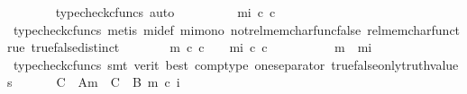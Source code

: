 \begin{isabellebody}
\ \ \ \ \ \ \isamarkupfalse%
\ {\isacharparenleft}{\kern0pt}typecheck{\isacharunderscore}{\kern0pt}cfuncs{\isacharcomma}{\kern0pt}\ auto{\isacharparenright}{\kern0pt}\isanewline
\ \ \ \ \isamarkupfalse%
\ \isamarkupfalse%
\ {\isachardoublequoteopen}{\isachardot}{\kern0pt}{\isachardot}{\kern0pt}{\isachardot}{\kern0pt}\ {\isacharequal}{\kern0pt}\ {\isacharparenleft}{\kern0pt}{\isasymchi}mi\ {\isasymcirc}\isactrlsub c\ c\ {\isacharequal}{\kern0pt}\ {\isasymt}{\isacharparenright}{\kern0pt}{\isachardoublequoteclose}\isanewline
\ \ \ \ \ \ \isamarkupfalse%
\ {\isacharparenleft}{\kern0pt}typecheck{\isacharunderscore}{\kern0pt}cfuncs{\isacharcomma}{\kern0pt}\ metis\ {\isasymchi}mi{\isacharunderscore}{\kern0pt}def\ mi{\isacharunderscore}{\kern0pt}mono\ not{\isacharunderscore}{\kern0pt}rel{\isacharunderscore}{\kern0pt}mem{\isacharunderscore}{\kern0pt}char{\isacharunderscore}{\kern0pt}func{\isacharunderscore}{\kern0pt}false\ rel{\isacharunderscore}{\kern0pt}mem{\isacharunderscore}{\kern0pt}char{\isacharunderscore}{\kern0pt}func{\isacharunderscore}{\kern0pt}true\ true{\isacharunderscore}{\kern0pt}false{\isacharunderscore}{\kern0pt}distinct{\isacharparenright}{\kern0pt}\isanewline
\ \ \ \ \isamarkupfalse%
\ \isamarkupfalse%
\ {\isachardoublequoteopen}{\isacharparenleft}{\kern0pt}{\isasymchi}m\ {\isasymcirc}\isactrlsub c\ c\ {\isacharequal}{\kern0pt}\ {\isasymt}{\isacharparenright}{\kern0pt}\ {\isacharequal}{\kern0pt}\ {\isacharparenleft}{\kern0pt}{\isasymchi}mi\ {\isasymcirc}\isactrlsub c\ c\ {\isacharequal}{\kern0pt}\ {\isasymt}{\isacharparenright}{\kern0pt}{\isachardoublequoteclose}\isacommand{{\isachardot}{\kern0pt}}\isamarkupfalse%
\isanewline
\ \ \isamarkupfalse%
\isanewline
\ \ \isamarkupfalse%
\ \isamarkupfalse%
\ {\isachardoublequoteopen}{\isasymchi}m\ {\isacharequal}{\kern0pt}\ {\isasymchi}mi{\isachardoublequoteclose}\isanewline
\ \ \ \ \isamarkupfalse%
\ {\isacharparenleft}{\kern0pt}typecheck{\isacharunderscore}{\kern0pt}cfuncs{\isacharcomma}{\kern0pt}\ smt\ {\isacharparenleft}{\kern0pt}verit{\isacharcomma}{\kern0pt}\ best{\isacharparenright}{\kern0pt}\ comp{\isacharunderscore}{\kern0pt}type\ one{\isacharunderscore}{\kern0pt}separator\ true{\isacharunderscore}{\kern0pt}false{\isacharunderscore}{\kern0pt}only{\isacharunderscore}{\kern0pt}truth{\isacharunderscore}{\kern0pt}values{\isacharparenright}{\kern0pt}\ \isanewline
\ \ \isamarkupfalse%
\ \isamarkupfalse%
\ {\isachardoublequoteopen}C\ {\isasymsetminus}\ {\isacharparenleft}{\kern0pt}A{\isacharcomma}{\kern0pt}m{\isacharparenright}{\kern0pt}\ {\isacharequal}{\kern0pt}\ C\ {\isasymsetminus}\ {\isacharparenleft}{\kern0pt}B{\isacharcomma}{\kern0pt}\ m\ {\isasymcirc}\isactrlsub c\ i{\isacharparenright}{\kern0pt}{\isachardoublequoteclose}\isanewline

\end{isabellebody}
